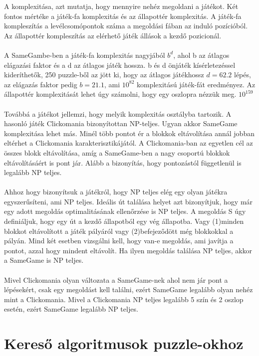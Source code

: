 \documentclass{article}
\begin{document}
	A komplexitása, azt mutatja, hogy mennyire nehéz megoldani a játékot. Két fontos mértéke a játék-fa komplexitás és az állapottér komplexitás.\cite{allis1994searching} A játék-fa kompleszítás a levélcsomópontok száma a megoldási fában az induló pozícióból. Az állapottér kompleszítás az elérhető játék állások a kezdő pozicionál.
	\\	
	\\
	A SameGambe-ben a játék-fa komplexitás nagyjából $b^d$, ahol b az átlagos elágazási faktor és a d az átlagos játék hossza. b és d önjáték kísérletezéssel kideríthetők, 250 puzzle-ből az jött ki, hogy az átlagos játékhossz $d=62.2$ lépés, az elágazás faktor pedig $b=21.1$, ami $10^{82}$ komplexitású játék-fát eredményez. Az állapottér komplexitását lehet úgy számolni, hogy egy oszlopra nézzük meg.  $10^{159}$\cite{schadd2012single} 
	\\
	\\
	Továbbá a játékot jellemzi, hogy melyik komplexitás osztályba tartozik. \cite{johnson1990catalog} A hasonló játék Clickomania bizonyítottan NP-teljes. \cite{fleischer2002complexity} Ugyan akkor SameGame komplexitása lehet más. Minél több pontot ér a blokkok eltávolítása annál jobban eltérhet a Clickomania karakterisztikájától. A Clickomania-ban az egyetlen cél az összes blokk eltávolítása, amíg a SameGame-ben a nagy csoportú blokkok eltávolításáért is pont jár. Alább a bizonyítás, hogy pontozástól függetlenül is legalább NP teljes.
	\\
	\\
	Ahhoz hogy bizonyítsuk a játékról, hogy NP teljes elég egy olyan játékra egyszerűsíteni, ami NP teljes. Ideális út találása helyet azt bizonyítjuk, hogy már egy adott megoldás optimalitásának ellenőrzése is NP teljes. A megoldás S úgy definiáljuk, hogy egy út a kezdő állapotból egy vég állapotba. Vagy (1)minden blokkot eltávolított a játék pályáról vagy (2)befejeződött még blokkokkal a pályán. Mind két esetben vizsgálni kell, hogy van-e megoldás, ami javítja a pontot, azzal hogy mindent eltávolít. Ha ilyen megoldás találása NP teljes, akkor a SameGame is NP teljes.
	\\
	\\
	Mivel Clickomania olyan változata a SameGame-nek ahol nem jár pont a lépésekért, csak egy megoldást kell találni, ezért SameGame legalább olyan nehéz mint a Clickomania. Mivel a Clickomania NP teljes legalább 5 szín és 2 oszlop esetén\cite{fleischer2002complexity}, ezért SameGame legalább NP teljes.
	
	\section{Kereső algoritmusok puzzle-okhoz}	
	
\end{document}
